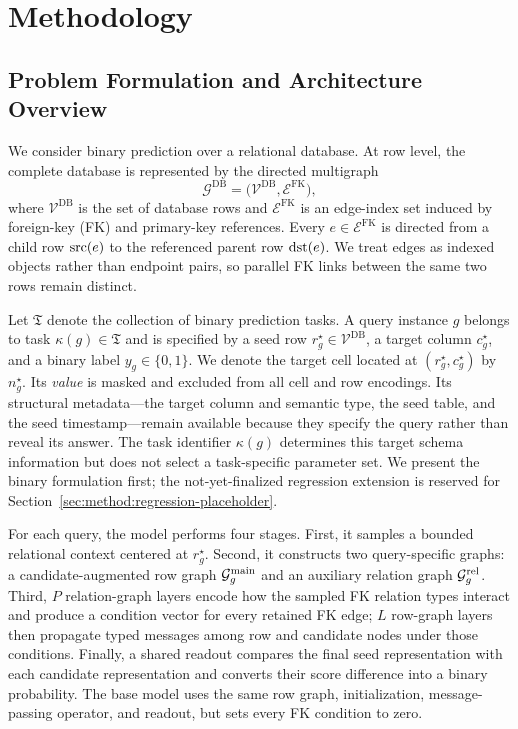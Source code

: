 \section{Methodology}
\label{sec:method}

\subsection{Problem Formulation and Architecture Overview}
\label{sec:method:problem-overview}

We consider binary prediction over a relational database. At row level, the
complete database is represented by the directed multigraph
\begin{equation}
  \mathcal G^{\mathrm{DB}}
  =
  \bigl(\mathcal V^{\mathrm{DB}},\mathcal E^{\mathrm{FK}}\bigr),
\label{eq:method:database-graph}
\end{equation}
where \(\mathcal V^{\mathrm{DB}}\) is the set of database rows and
\(\mathcal E^{\mathrm{FK}}\) is an edge-index set induced by foreign-key
(FK) and primary-key references. Every \(e\in\mathcal E^{\mathrm{FK}}\) is
directed from a child row \(\operatorname{src}(e)\) to the referenced parent row
\(\operatorname{dst}(e)\). We treat edges as indexed objects rather than endpoint pairs,
so parallel FK links between the same two rows remain distinct.

Let \(\mathfrak T\) denote the collection of binary prediction tasks. A
query instance \(g\) belongs to task \(\kappa(g)\in\mathfrak T\) and is
specified by a seed row \(r_g^\star\in\mathcal V^{\mathrm{DB}}\), a target
column \(c_g^\star\), and a binary label \(y_g\in\{0,1\}\). We denote the
target cell located at \((r_g^\star,c_g^\star)\) by \(n_g^\star\). Its
\emph{value} is masked and excluded from all cell and row encodings. Its
structural metadata---the target column and semantic type, the seed table,
and the seed timestamp---remain available because they specify the query
rather than reveal its answer.
The task identifier \(\kappa(g)\) determines this target schema information
but does not select a task-specific parameter set. We present the binary
formulation first; the not-yet-finalized regression extension is reserved
for Section~\ref{sec:method:regression-placeholder}.

For each query, the model performs four stages. First, it samples a bounded
relational context centered at \(r_g^\star\). Second, it constructs two
query-specific graphs: a candidate-augmented row graph
\(\mathcal G_g^{\mathrm{main}}\) and an auxiliary relation graph
\(\mathcal G_g^{\mathrm{rel}}\). Third, \(P\) relation-graph layers encode how
the sampled FK relation types interact and produce a condition vector for
every retained FK edge; \(L\) row-graph layers then propagate typed messages
among row and candidate nodes under those conditions. Finally, a shared
readout compares the final seed representation with each candidate
representation and converts their score difference into a binary
probability. The base model uses the same row graph, initialization,
message-passing operator, and readout, but sets every FK condition to zero.

